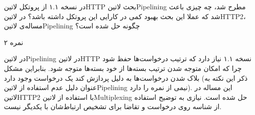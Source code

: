 \documentclass[../main.tex]{subfiles}
\begin{document}

در نسخه ۱.۱ از پروتکل ‌لاتین{HTTP} بحث ‌لاتین{Pipelining} مطرح شد، چه چیزی باعث شد که عملا این بحث بهبود کمی در کارایی این پروتکل داشته باشد؟
در ‌لاتین{HTTP2}، مساله‌ی ‌لاتین{Pipelining} چگونه حل شده است؟

۲ نمره

\begin{answer}

در ‌لاتین{Pipelining} در ‌لاتین{HTTP} نسخه ۱.۱ نیاز دارد که ترتیب درخواست‌ها حفظ شود
چرا که امکان متوجه شدن ترتیب بسته‌ها از خود بسته‌ها متوجه شود.
بنابراین مشکل بلاک شدن درخواست‌ها به دلیل پردازش کند یک درخواست
وجود دارد (ذکر این نکته به عنوان دلیل عدم استفاده از ‌لاتین{Pipelining} نیمی از نمره را دارد). این مساله در ‌لاتین{HTTP2} با استفاده از ‌لاتین{Multiplexing} حل شده است.
نیازی به توضیح استفاده از شناسه روی درخواست و تقاضا برای تشخیص ارتباط‌شان با یکدیگر نیست.

\end{answer}
\end{document}
